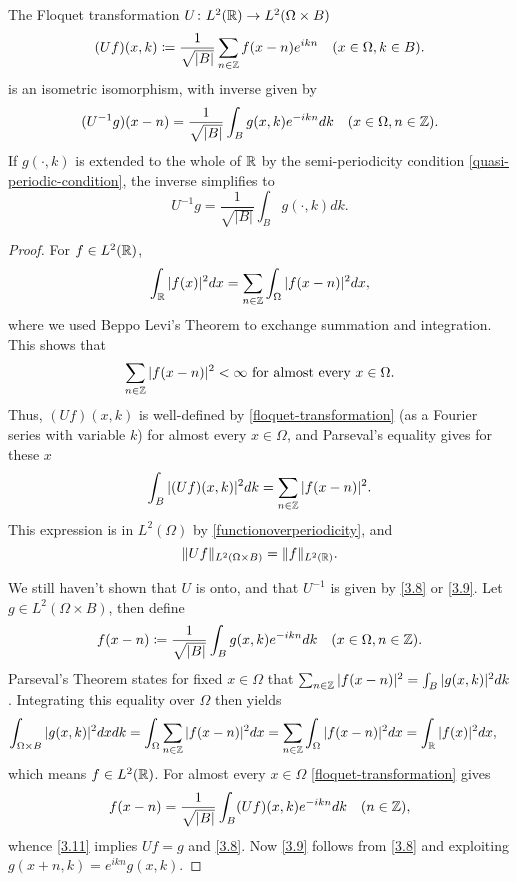 \begin{theorem} \label{3.2:thm-UIsometricIsomorphism}
	The Floquet transformation $U \colon L^{2}(\mathbb{R}) \rightarrow L^{2}(\Omega \times B)$ 
	\begin{equation}
		(Uf)(x, k) \coloneqq \frac{1}{\sqrt{|B|}} \sum_{n \in \mathbb{Z}} f(x - n) e^{ikn} \quad (x \in \Omega, k \in B). \label{floquet-transformation}
	\end{equation}
	is an isometric isomorphism, with inverse given by
		\begin{equation}
			(U^{-1}g)(x - n) = \frac{1}{\sqrt{|B|}} \int_{B} g(x, k) e^{-ikn} dk \quad (x \in \Omega, n \in \mathbb{Z}). \label{3.8}
		\end{equation} 
	If $g(\cdot, k)$ is extended to the whole of $\mathbb{R}$ by the semi-periodicity condition \eqref{quasi-periodic-condition}, the inverse simplifies to
		\begin{equation}
			U^{-1} g = \frac{1}{\sqrt{|B|}} \int_{B} g(\cdot, k) dk. \label{3.9}
		\end{equation}
		
	\begin{proof}
		For $f \in L^{2}(\mathbb{R})$,
		\begin{equation}
			\int_{\mathbb{R}} |f(x)|^{2} dx = \sum_{n \in \mathbb{Z}} \int_{\Omega} |f(x - n)|^{2} dx,\label{functionoverperiodicity}
		\end{equation} 
		where we used Beppo Levi's Theorem to exchange summation and integration. This shows that
		\[ \sum_{n \in \mathbb{Z}} |f(x - n)|^{2} < \infty \text{ for almost every } x \in \Omega.\]
		Thus, $(Uf)(x, k)$ is well-defined by \eqref{floquet-transformation} (as a Fourier series with variable $k$) for almost every $x \in \Omega$, and Parseval's equality gives for these $x$
		\[ \int_{B}|(Uf)(x,k)|^{2} dk = \sum_{n \in \mathbb{Z}} |f(x - n)|^{2}. \]
	 	This expression is in $L^{2}(\Omega)$ by \eqref{functionoverperiodicity}, and
		\[ \| Uf \|_{L^{2}(\Omega \times B)} = \|f\|_{L^{2}(\mathbb{R})}. \]
		
		We still haven't shown that $U$ is onto, and that $U^{-1}$ is given by \eqref{3.8} or \eqref{3.9}. Let $g \in L^{2}(\Omega \times B)$, then define
		\begin{equation}
			f(x - n) \coloneqq \frac{1}{\sqrt{|B|}} \int_{B} g(x, k) e^{-ikn} dk \quad (x \in \Omega, n \in\mathbb{Z}).\label{3.11}
		\end{equation}
		Parseval's Theorem states for fixed $x \in \Omega$ that $\sum_{n \in \mathbb{Z}} |f(x - n)|^{2} = \int_{B} |g(x, k)|^{2} dk$. Integrating this equality over $\Omega$ then yields
		\begin{align*}
			\int_{\Omega \times B} |g(x, k)|^{2} dx dk & = \int_{\Omega} \sum_{n \in \mathbb{Z}} |f(x - n)|^{2} dx  = \sum_{n \in\mathbb{Z}} \int_{\Omega} |f(x-n)|^{2} dx = \int_{\mathbb{R}} |f(x)|^{2} dx,	
		\end{align*}
		which means $f \in L^{2}(\mathbb{R})$. For almost every $x \in \Omega$ \eqref{floquet-transformation} gives
		\[ f(x - n) = \frac{1}{\sqrt{|B|}} \int_{B} (Uf)(x,k) e^{-ikn} dk \quad (n \in \mathbb{Z}), \]
		whence \eqref{3.11} implies $U f = g$ and \eqref{3.8}. Now \eqref{3.9} follows from \eqref{3.8} and exploiting $g(x + n, k) = e^{ikn} g(x, k)$.
	\end{proof}				
\end{theorem}

